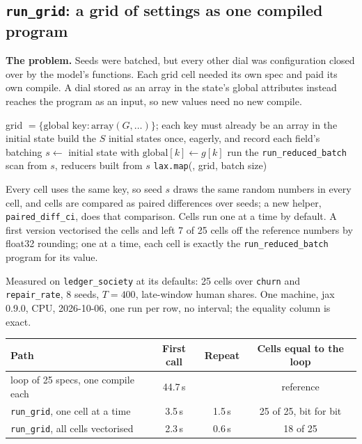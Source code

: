 \documentclass[11pt]{article}
\newcommand{\code}[1]{\texttt{#1}}
\begin{document}
\subsection{\code{run\_grid}: a grid of settings as one compiled program}

\textbf{The problem.} Seeds were batched, but every other dial was configuration closed
over by the model's functions. Each grid cell needed its own spec and paid its own
compile. A dial stored as an array in the state's global attributes instead reaches the
program as an input, so new values need no new compile.

\begin{algorithm}[H]
\caption{\code{EnvSpec.run\_grid}$(key, S, T, \text{grid}, \text{reducers}, \text{batch}=1)$}
\begin{algorithmic}[1]
\Require grid $=\{\text{global key}: \text{array}(G, \dots)\}$; each key must already be an array in the initial state
\State build the $S$ initial states once, eagerly, and record each field's batching
  \For{each seed, under \code{vmap}}
    \State $s \gets$ initial state with $\text{global}[k] \gets g[k]$ \Comment{\code{with\_globals}, pure}
    \State run the \code{run\_reduced\_batch} scan from $s$, reducers built from $s$
  \EndFor
\EndFunction
\State \Return \code{lax.map}(, grid, batch size) 
\end{algorithmic}
\end{algorithm}

\noindent Every cell uses the same key, so seed $s$ draws the same random numbers in
every cell, and cells are compared as paired differences over seeds; a new helper,
\code{paired\_diff\_ci}, does that comparison. Cells run one at a time by default. A
first version vectorised the cells and left 7 of 25 cells off the reference numbers by
float32 rounding; one at a time, each cell is exactly the \code{run\_reduced\_batch}
program for its value.

Measured on \code{ledger\_society} at its defaults: 25 cells over \code{churn} and
\code{repair\_rate}, 8 seeds, $T=400$, late-window human shares. One machine, jax 0.9.0,
CPU, 2026-10-06, one run per row, no interval; the equality column is exact.

\begin{center}
\begin{tabular}{@{}lccc@{}}
\toprule
\textbf{Path} & \textbf{First call} & \textbf{Repeat} & \textbf{Cells equal to the loop} \\
\midrule
loop of 25 specs, one compile each & 44.7\,s & & reference \\
\code{run\_grid}, one cell at a time & 3.5\,s & 1.5\,s & 25 of 25, bit for bit \\
\code{run\_grid}, all cells vectorised & 2.3\,s & 0.6\,s & 18 of 25 \\
\bottomrule
\end{tabular}
\end{center}
\end{document}
